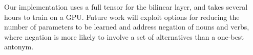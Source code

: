 \documentclass[11pt]{article}
\begin{document}
Our implementation uses a full tensor for the bilinear layer, and takes several hours to train on a GPU. Future work will exploit options for reducing the number of parameters to be learned \citep{alain:13} and address negation of nouns and verbs,
where negation is more likely to involve a set of alternatives than a one-best antonym.

\clearpage



% 
\end{document}
